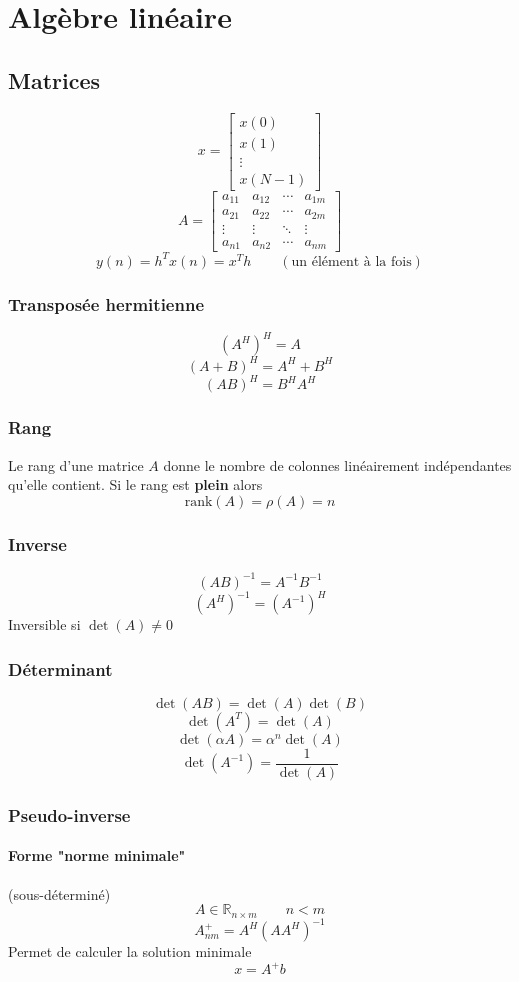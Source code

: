 \documentclass[resume]{subfiles}
\begin{document}
\section{Algèbre linéaire}
\subsection{Matrices}
$$x=\begin{bmatrix}
x(0)\\x(1)\\\vdots\\x(N-1)
\end{bmatrix}$$
$$A=\begin{bmatrix}
a_{11} & a_{12} & \cdots & a_{1m}\\
a_{21} & a_{22} & \cdots & a_{2m}\\
\vdots & \vdots & \ddots & \vdots\\
a_{n1} & a_{n2} & \cdots & a_{nm}
\end{bmatrix}$$
$$y(n)=h^Tx(n)=x^Th\qquad (\text{un élément à la fois})$$
\subsubsection{Transposée hermitienne}
$$\left(A^{H}\right)^{H}=A$$
$$(A+B)^{H}=A^H+B^H$$
$$(AB)^H=B^HA^H$$
\subsubsection{Rang}
Le rang d'une matrice $A$ donne le nombre de colonnes linéairement indépendantes qu'elle contient. Si le rang est \textbf{plein} alors
$$\text{rank}(A)=\rho(A)=n$$
\subsubsection{Inverse}
$$(AB)^{-1}=A^{-1}B^{-1}$$
$$(A^{H})^{-1}=(A^{-1})^{H}$$
Inversible si $\det(A)\neq 0$
\subsubsection{Déterminant}
$$\det(AB)=\det(A)\det(B)$$
$$\det(A^{T})=\det(A)$$
$$\det(\alpha A)=\alpha^{n}\det(A)$$
$$\det(A^{-1})=\frac{1}{\det(A)}$$
\subsubsection{Pseudo-inverse}
\paragraph{Forme "norme minimale"} (sous-déterminé)
$$A\in \mathbb{R}_{n\times m}\qquad n<m$$
$$\boxed{A^{+}_{nm}=A^{H}(AA^{H})^{-1}}$$
Permet de calculer la solution minimale
$$x=A^{+}b$$
\end{document}
